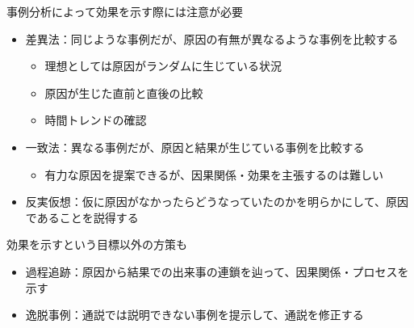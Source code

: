 \documentclass[
  xelatex,
  ja=standard]{bxjsarticle}
\providecommand{\tightlist}{%
  \setlength{\itemsep}{0pt}\setlength{\parskip}{0pt}}\usepackage{longtable,booktabs,array}
\begin{document}
事例分析によって効果を示す際には注意が必要\citep{kume2013, ito2022}

\begin{itemize}
\tightlist
\item
  差異法：同じような事例だが、原因の有無が異なるような事例を比較する

  \begin{itemize}
  \tightlist
  \item
    理想としては原因がランダムに生じている状況
  \item
    原因が生じた直前と直後の比較
  \item
    時間トレンドの確認
  \end{itemize}
\item
  一致法：異なる事例だが、原因と結果が生じている事例を比較する

  \begin{itemize}
  \tightlist
  \item
    有力な原因を提案できるが、因果関係・効果を主張するのは難しい
  \end{itemize}
\item
  反実仮想：仮に原因がなかったらどうなっていたのかを明らかにして、原因であることを説得する
\end{itemize}

効果を示すという目標以外の方策も

\begin{itemize}
\tightlist
\item
  過程追跡：原因から結果での出来事の連鎖を辿って、因果関係・プロセスを示す
\item
  逸脱事例：通説では説明できない事例を提示して、通説を修正する
\end{itemize}


  
\end{document}
